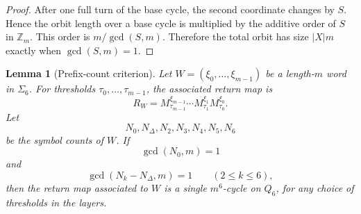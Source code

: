 \documentclass[11pt]{article}
\newtheorem{lemma}{Lemma}
\theoremstyle{definition}
\begin{document}
\begin{proof}
After one full turn of the base cycle, the second coordinate changes by \(S\).  Hence the orbit length
over a base cycle is multiplied by the additive order of \(S\) in \(\mathbb Z_m\).  This order is
\(m/\gcd(S,m)\).  Therefore the total orbit has size \(|X|m\) exactly when \(\gcd(S,m)=1\).
\end{proof}

\begin{lemma}[Prefix-count criterion]\label{lem:count-criterion}
Let \(W=(\xi_0,\ldots,\xi_{m-1})\) be a length-\(m\) word in \(\Sigma_6\).  For thresholds \(\tau_0,\ldots,\tau_{m-1}\), the associated return map is
\[
R_W=M_{\tau_{m-1}}^{\xi_{m-1}}\cdots M_{\tau_1}^{\xi_1}M_{\tau_0}^{\xi_0}.
\]
Let
\[
N_0,N_\Delta,N_2,N_3,N_4,N_5,N_6
\]
be the symbol counts of \(W\).  If
\[
\gcd(N_0,m)=1
\]
and
\[
\gcd(N_k-N_\Delta,m)=1\qquad(2\le k\le6),
\]
then the return map associated to \(W\) is a single \(m^6\)-cycle on \(Q_6\), for any choice of
thresholds in the layers.
\end{lemma}
\end{document}
